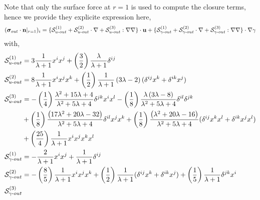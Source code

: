 Note that only the surface force at $r=1$ is used to compute the closure terms, hence we provide they explicite expression here,
\begin{align*}
    (\bm\sigma_{out}\cdot \textbf{n}|_{r=1})_{i}
    &=
    \{\mathcal{S}_{u\text -out}^{(1)} + \mathcal{S}_{u\text -out}^{(2)}\cdot \mathbf{\nabla} + \mathcal{S}_{u\text -out}^{(3)} :\mathbf{\nabla}\mathbf{\nabla}\}\cdot \textbf{u} 
    +
    \{\mathcal{S}_{\gamma\text -out}^{(1)} + \mathcal{S}_{\gamma\text -out}^{(2)}\cdot \mathbf{\nabla} + \mathcal{S}_{\gamma\text -out}^{(3)} :\mathbf{\nabla}\mathbf{\nabla}\} \cdot \mathbf{\nabla} \gamma\\
\end{align*}
with,
\begin{align*}
    \mathcal{S}^{(1)}_{u\text-out} 
    &= 3\frac{1}{\lambda + 1}x{}^{i}x{}^{j} 
    + \left(\frac{3}{2}\right)\frac{\lambda}{\lambda + 1}\delta^{ij} \\
    \mathcal{S}^{(2)}_{u\text-out} 
    &=
    8\frac{1}{\lambda + 1}x{}^{i}x{}^{j}x{}^{k} 
    + \left(\frac{1}{2}\right)\frac{1}{\lambda + 1}\left(3 \lambda - 2\right)(\delta{}^{ij}x{}^{k} +\delta{}^{ik}x{}^{j})\\
    \mathcal{S}^{(3)}_{u\text-out} 
    &=
    -\left(\frac{1}{4}\right)\frac{\lambda^{2} + 15 \lambda + 4}{\lambda^{2} + 5 \lambda + 4}\delta{}^{jk}x{}^{i}x{}^{l} 
    - \left(\frac{1}{8}\right)\frac{\lambda\left(3 \lambda - 8\right)}{\lambda^{2} + 5 \lambda + 4}\delta{}^{il}\delta{}^{jk} \\
    &+ \left(\frac{1}{8}\right)\frac{\left(17 \lambda^{2} + 20 \lambda - 32\right)}{\lambda^{2} + 5 \lambda + 4}\delta{}^{il}x{}^{j}x{}^{k} 
    + \left(\frac{1}{8}\right)\frac{\left(\lambda^{2} + 20 \lambda - 16\right)}{\lambda^{2} + 5 \lambda + 4}(\delta{}^{ij}x{}^{k}x{}^{l} +\delta{}^{ik}x{}^{j}x{}^{l} )\\
    &+ \left(\frac{25}{4}\right)\frac{1}{\lambda + 1}x{}^{i}x{}^{j}x{}^{k}x{}^{l}\\
    \mathcal{S}^{(1)}_{\gamma\text-out} 
    &=
    -\frac{2}{\lambda + 1}x{}^{i}x{}^{j} 
    + \frac{1}{\lambda + 1}\delta{}^{ij}\\
    \mathcal{S}^{(2)}_{\gamma\text-out} 
    &=
    -\left(\frac{8}{5}\right)\frac{1}{\lambda + 1}x{}^{i}x{}^{j}x{}^{k} 
    + \left(\frac{1}{2}\right)\frac{1}{\lambda + 1}(\delta{}^{ij}x{}^{k} +\delta{}^{ik}x{}^{j})
    + \left(\frac{1}{5}\right)\frac{1}{\lambda + 1}\delta{}^{jk}x{}^{i}\\
    \mathcal{S}^{(3)}_{\gamma\text-out} 

\end{align*}
